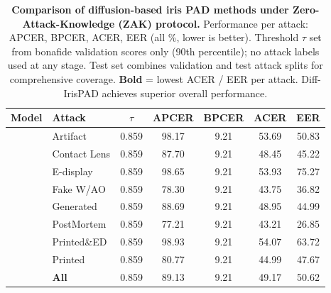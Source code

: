 \begin{table}[!htbp]
\centering
\scriptsize
\setlength{\tabcolsep}{3pt}
\caption{
\textbf{Comparison of diffusion-based iris PAD methods under Zero-Attack-Knowledge (ZAK) protocol.}
Performance per attack: APCER, BPCER, ACER, EER (all \%, lower is better).
Threshold $\tau$ set from bonafide validation scores only (90th percentile); no attack labels used at any stage.
Test set combines validation and test attack splits for comprehensive coverage.
\textbf{Bold} = lowest ACER / EER per attack. Diff-IrisPAD achieves superior overall performance.
}
\label{tab:diffusion_comparison_zak}

\begin{tabular}{l l c c c c c}
\toprule
\textbf{Model} & \textbf{Attack} & $\tau$ & APCER & BPCER & ACER & EER \\
\midrule

    & Artifact             & 0.859 &  98.17 &   9.21 &          53.69 &          50.83 \\
    & Contact Lens         & 0.859 &  87.70 &   9.21 &          48.45 &          45.22 \\
    & E-display            & 0.859 &  98.65 &   9.21 &          53.93 &          75.27 \\
    & Fake W/AO            & 0.859 &  78.30 &   9.21 &          43.75 &          36.82 \\
    & Generated            & 0.859 &  88.69 &   9.21 &          48.95 &          44.99 \\
    & PostMortem           & 0.859 &  77.21 &   9.21 &          43.21 &          26.85 \\
    & Printed\&ED          & 0.859 &  98.93 &   9.21 &          54.07 &          63.72 \\
    & Printed              & 0.859 &  80.77 &   9.21 &          44.99 &          47.67 \\
    & \textbf{All}               & 0.859 &  89.13 &   9.21 & 49.17 & 50.62 \\

    \midrule


\end{tabular}
\end{table}
